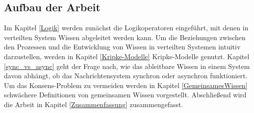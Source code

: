 \subsection{Aufbau der Arbeit}
Im Kapitel \ref{Logik} werden zunächst die Logikoperatoren eingeführt, mit denen in verteilten System Wissen abgeleitet werden kann.
Um die Beziehungen zwischen den Prozessen und die Entwicklung von Wissen in verteilten Systemen intuitiv darzustellen, werden in Kapitel \ref{Kripke-Modelle} Kripke-Modelle genutzt. Kapitel \ref{sync_vs_async} geht der Frage nach, wie das ableitbare Wissen in einem System davon abhängt, ob das Nachrichtensystem synchron oder asynchron funktioniert. Um das Konsens-Problem zu vermeiden werden in Kapitel \ref{GemeinsamesWissen} schwächere Definitionen von gemeinsamen Wissen vorgestellt.
Abschließend wird die Arbeit in Kapitel \ref{Zusammenfassung} zusammengefasst.